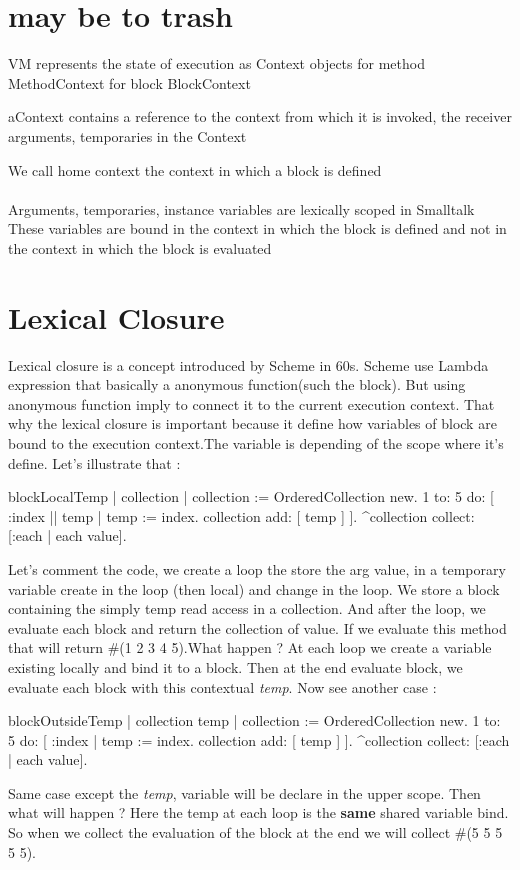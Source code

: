 \documentclass[a4paper,10pt,twoside]{book}
\begin{document}
\section{may be to trash}
VM represents the state of execution as Context objects
for method MethodContext
for block BlockContext

aContext contains a reference to the context from which it is invoked, the receiver arguments, temporaries in the Context

We call home context the context in which a block is defined


\paragraph{}
Arguments, temporaries, instance variables are lexically scoped in Smalltalk
These variables are bound in the context in which the block is defined and not in the context in which the block is evaluated


\section{Lexical Closure}
Lexical closure is a concept introduced by Scheme in 60s. Scheme use Lambda expression that basically a anonymous function(such the block). But using anonymous function imply to connect it to the current execution context. That why the lexical closure is important because it define how variables of block are bound to the execution context.The variable is depending of the scope where it's define. Let's illustrate that :

\begin{code}{}
blockLocalTemp
	| collection |
		collection := OrderedCollection new.
		1 to: 5 do: [ :index || temp |
			temp := index. 
			collection add: [ temp ] ].
		^collection collect: [:each | each value].
\end{code}

Let's comment the code, we create a loop the store the arg value, in a temporary variable create in the loop (then local) and change in the loop. We store a block containing the simply temp read access in a collection. And after the loop, we evaluate each block and return the collection of value.
If we evaluate this method that will return \#(1 2 3 4 5).What happen  ? At each loop we create a variable existing locally and bind it to a block. Then at the end evaluate block, we evaluate each block with this contextual \emph{temp}. 
Now see another case : 
\begin{code}{}
blockOutsideTemp
		| collection temp |
		collection := OrderedCollection new.
		1 to: 5 do: [ :index | 
			temp := index. 
			collection add: [ temp ] ].
		^collection collect: [:each | each value].
\end{code}
Same case except the \emph{temp}, variable will be  declare in the upper scope. Then what will happen ? Here the temp at each loop is the \textbf{same} shared variable bind. So when we collect the evaluation of the block at the end we will collect \#(5 5 5 5 5).
\end{document}
